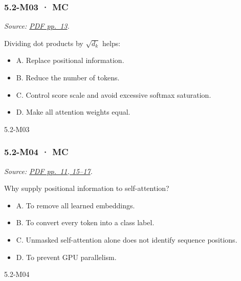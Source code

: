 \noindent\begin{minipage}{\linewidth}

\subsubsection{5.2-M03 · MC}\label{m03-mc-13}

\emph{Source:
\href{../Lecture\%20Slides/5.2.\%20Transformers.pdf\#page=13}{PDF
pp.~13}.}

Dividing dot products by \(\sqrt{d_k}\) helps:

\begin{itemize}
\tightlist
\item
  A. Replace positional information.
\item
  B. Reduce the number of tokens.
\item
  C. Control score scale and avoid excessive softmax saturation.
\item
  D. Make all attention weights equal.
\end{itemize}

\begin{solution}[8mm]{5.2-M03}

\end{solution}
\end{minipage}\par\medskip

\noindent\begin{minipage}{\linewidth}

\subsubsection{5.2-M04 · MC}\label{m04-mc-13}

\emph{Source:
\href{../Lecture\%20Slides/5.2.\%20Transformers.pdf\#page=11}{PDF
pp.~11, 15--17}.}

Why supply positional information to self-attention?

\begin{itemize}
\tightlist
\item
  A. To remove all learned embeddings.
\item
  B. To convert every token into a class label.
\item
  C. Unmasked self-attention alone does not identify sequence positions.
\item
  D. To prevent GPU parallelism.
\end{itemize}

\begin{solution}[8mm]{5.2-M04}

\end{solution}
\end{minipage}\par\medskip

